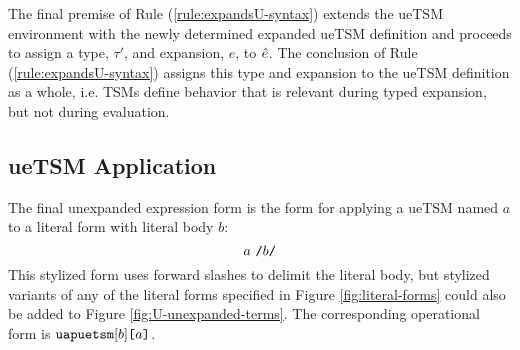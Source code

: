 \begin{enumerate}
The final premise of Rule (\ref{rule:expandsU-syntax}) extends the ueTSM environment with the newly determined {expanded ueTSM definition} and proceeds to assign a type, $\tau'$, and expansion, $e$, to $\hat{e}$. The conclusion of Rule (\ref{rule:expandsU-syntax}) assigns this type and expansion to the ueTSM definition as a whole, i.e. TSMs define behavior that is relevant during typed expansion, but not during evaluation. 

\end{enumerate}

\subsection{ueTSM Application}\label{sec:U-uetsm-application}
The final unexpanded expression form is the form for applying a ueTSM named $a$ to a literal form with literal body $b$:
\[
a~\texttt{/}b\texttt{/}
\] 
This stylized form uses forward slashes to delimit the literal body, but stylized variants of any of the literal forms specified in Figure \ref{fig:literal-forms} could also be added to Figure \ref{fig:U-unexpanded-terms}. %
The corresponding operational form is $\texttt{uapuetsm}[b]\texttt{[}a\texttt{]}$. %

